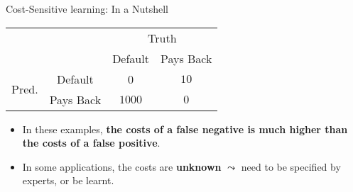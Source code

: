 \documentclass[11pt,compress,t,notes=noshow, xcolor=table]{beamer}
\begin{document}
\begin{vbframe}{Cost-Sensitive learning: In a Nutshell}
{        \begin{minipage}{0.49\textwidth}
            \begin{table}[]
                \centering
                \begin{tabular}{p{1cm}c|cc}
                    & &\multicolumn{2}{c}{Truth} \\
                    & & Default & Pays Back  \\
                    \hline
                    \multirow{2}{*}{\parbox{1cm}{Pred.}} & Default & 0 & $ 10 $\\
                    & Pays Back & $1000$ & $0$   \\
                \end{tabular}
            \end{table}
        \end{minipage}
        \hfill
        \begin{minipage}{0.49\textwidth}
            \begin{itemize}
                \scriptsize
                \item In these examples, \textbf{the costs of a false negative is much higher than the costs of a false positive}.
                \vspace{15pt}
                
                \item In some applications, the costs are \textbf{unknown} $\leadsto$ need to be specified by experts, or be learnt.
            \end{itemize}   
        \end{minipage}
		
	}
\end{vbframe}
\end{document}
